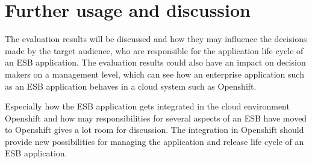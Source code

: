 \section{Further usage and discussion}
\label{sec:induction}
The evaluation results will be discussed and how they may influence the decisions made by the target audience, who are responsible for the application life cycle of an ESB application. The evaluation results could also have an impact on decision makers on a management level, which can see how an enterprise application such as an ESB application behaves in a cloud system such as Openshift. 

Especially how the ESB application gets integrated in the cloud environment Openshift and how may responsibilities for several aspects of an ESB have moved to Openshift gives a lot room for discussion. The integration in Openshift should provide new possibilities for managing the application and release life cycle of an ESB application. 